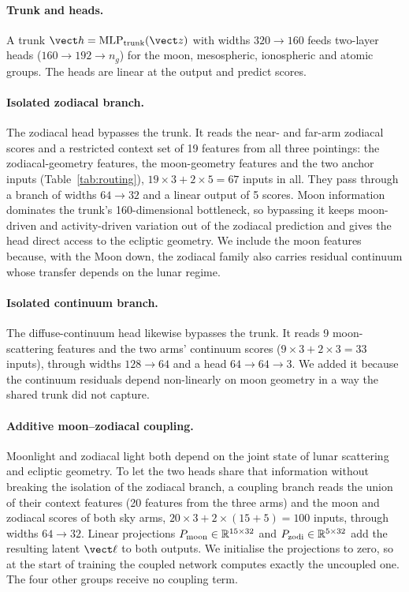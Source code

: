 \paragraph{Trunk and heads.} A trunk
$\vect h = \mathrm{MLP}_{\rm trunk}(\vect z)$ with widths $320\to160$ feeds
two-layer heads ($160\to192\to n_g$) for the moon, mesospheric, ionospheric
and atomic groups. The heads are linear at the output and predict scores.

\paragraph{Isolated zodiacal branch.} The zodiacal head bypasses the trunk.
It reads the near- and far-arm zodiacal scores and a restricted context set
of 19 features from all three pointings: the zodiacal-geometry features, the
moon-geometry features and the two anchor inputs (Table~\ref{tab:routing}),
$19\times3+2\times5 = 67$ inputs in all. They pass through a branch of
widths $64\to32$ and a linear output of 5 scores. Moon information dominates
the trunk's 160-dimensional bottleneck, so bypassing it keeps moon-driven
and activity-driven variation out of the zodiacal prediction and gives the
head direct access to the ecliptic geometry. We include the moon features
because, with the Moon down, the zodiacal family also carries residual
continuum whose transfer depends on the lunar regime.

\paragraph{Isolated continuum branch.} The diffuse-continuum head likewise
bypasses the trunk. It reads 9 moon-scattering features and the two arms'
continuum scores ($9\times3 + 2\times3 = 33$ inputs), through widths
$128\to64$ and a head $64\to64\to3$. We added it because the continuum
residuals depend non-linearly on moon geometry in a way the shared trunk did
not capture.

\paragraph{Additive moon--zodiacal coupling.} Moonlight and zodiacal light
both depend on the joint state of lunar scattering and ecliptic geometry. To
let the two heads share that information without breaking the isolation of
the zodiacal branch, a coupling branch reads the union of their context
features (20 features from the three arms) and the moon and zodiacal scores
of both sky arms, $20\times3 + 2\times(15+5) = 100$ inputs, through widths
$64\to32$. Linear projections $P_{\rm moon}\in\mathbb{R}^{15\times32}$ and
$P_{\rm zodi}\in\mathbb{R}^{5\times32}$ add the resulting latent $\vect\ell$
to both outputs. We initialise the projections to zero, so at the start of
training the coupled network computes exactly the uncoupled one. The four
other groups receive no coupling term.

